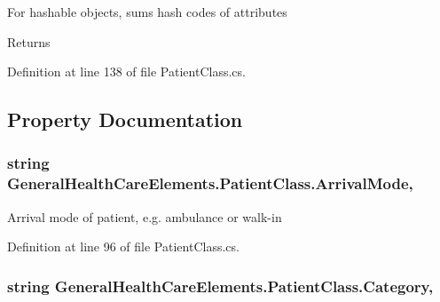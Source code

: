 For hashable objects, sums hash codes of attributes 

\begin{DoxyReturn}{Returns}

\end{DoxyReturn}


Definition at line 138 of file Patient\+Class.\+cs.



\subsection{Property Documentation}
\subsubsection[{\texorpdfstring{Arrival\+Mode}{ArrivalMode}}]{\setlength{\rightskip}{0pt plus 5cm}string General\+Health\+Care\+Elements.\+Patient\+Class.\+Arrival\+Mode\hspace{0.3cm}{\ttfamily [get]}, {\ttfamily [set]}}\hypertarget{class_general_health_care_elements_1_1_patient_class_a0a8a0593a4a5476405605a4c4fb9665b}{}\label{class_general_health_care_elements_1_1_patient_class_a0a8a0593a4a5476405605a4c4fb9665b}


Arrival mode of patient, e.\+g. ambulance or walk-\/in 



Definition at line 96 of file Patient\+Class.\+cs.

\subsubsection[{\texorpdfstring{Category}{Category}}]{\setlength{\rightskip}{0pt plus 5cm}string General\+Health\+Care\+Elements.\+Patient\+Class.\+Category\hspace{0.3cm}{\ttfamily [get]}, {\ttfamily [set]}}\hypertarget{class_general_health_care_elements_1_1_patient_class_abdf23c862a9e0c7ec75808ae1f285aae}{}\label{class_general_health_care_elements_1_1_patient_class_abdf23c862a9e0c7ec75808ae1f285aae}


